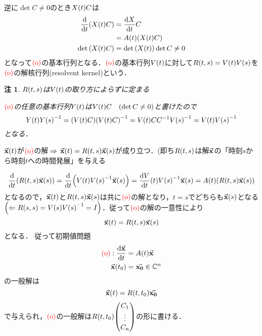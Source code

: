 \documentclass[autodetect-engine,dvipdfmx-if-dvi,ja=standard]{bxjsarticle}
\makeatletter
\theoremstyle{mystyle1}
\theoremstyle{mystyle2}
\newtheorem{note}{注}
\renewenvironment{proof}[1][\proofname]{\par
  \pushQED{\qed}%
  \normalfont
  \topsep6\p@\@plus6\p@ \trivlist
  \item[\hskip\labelsep{\bfseries\sffamily #1}]\ignorespaces
}{%
  \popQED\endtrivlist\@endpefalse
}
\renewcommand\proofname{\ensuremath{\because}}
\newcommand{\redo}{\ensuremath{\color{red}\qty(\textrm{o})\color{black}}}
\newcommand{\bbC}{\ensuremath{\mathbb{C}}}
\makeatother
\begin{document}
逆に$\det C\neq 0$のとき$X\qty(t)C$は
\begin{align*}
  \dv{t}\qty(X\qty(t)C)
   & =\dv{X}{t}C                     \\
   & =A\qty(t)\qty(X\qty(t)C)        \\
  \det\qty(X\qty(t)C)
   & =\det\qty(X\qty(t))\det C\neq 0
\end{align*}
となって\redo の基本行列となる．\redo の基本行列$V\qty(t)$に対して\underline{$R\qty(t,s)=V\qty(t)V\qty(s)$}を\redo の解核行列(resolvent kernel)という．
\begin{note}
  $R\qty(t,s)$は$V\qty(t)$の取り方によらずに定まる
  \begin{proof}
    \redo の任意の基本行列$Y\qty(t)$は$V\qty(t)C\quad\qty(\det C\neq 0)$と書けたので
    \[Y\qty(t)Y\qty(s)^{-1}=\qty(V\qty(t)C)\qty(V\qty(t)C)^{-1}=V\qty(t)CC^{-1}V\qty(s)^{-1}=V\qty(t)V\qty(s)^{-1}\]
    となる．
  \end{proof}
\end{note}
$\va{x}\qty(t)$が\redo の解\,$\Rightarrow\,\va{x}\qty(t)=R\qty(t,s)\va{x}\qty(s)$が成り立つ．(即ち$R\qty(t,s)$は解$\va{x}$の「時刻$s$から時刻$t$への時間発展」を与える
\begin{proof}
  \[\dv{t}\qty(R\qty(t,s)\va{x}\qty(s))=\dv{t}\qty(V\qty(t)V\qty(s)^{-1}\va{x}\qty(s))=\dv{V}{t}\qty(t)V\qty(s)^{-1}\va{x}\qty(s)=A\qty(t)\qty(R\qty(t,s)\va{x}\qty(s))\]
  となるので，$\va{x}\qty(t)$と$R\qty(t,s)\va{x}\qty(s)$は共に\redo の解となり，$t=s$でどちらも$\va{x}\qty(s)$となる$\qty(\Leftarrow R\qty(s,s)=V\qty(s)V\qty(s)^{-1}=I)$．従って\redo の解の一意性により
  \[\va{x}\qty(t)=R\qty(t,s)\va{x}\qty(s)\]
  となる．
\end{proof}
従って初期値問題
\begin{align*}
  \redo:\dv{\va{x}}{t} & =A\qty(t)\va{x}    \\
  \va{x}\qty(t_0)      & =\va{x_0}\in\bbC^n
\end{align*}
の一般解は
\[\va{x}\qty(t)=R\qty(t,t_0)\va{x_0}\]
で与えられ，\redo の一般解は$R\qty(t,t_0)\mqty(
  C_1\\
  \vdots\\
  C_n
  )$の形に書ける．
\end{document}
